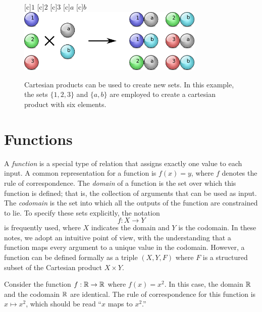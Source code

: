 \begin{figure}[htb]
\begin{center}
\begin{psfrags}
[c]{$1$}
[c]{$2$}
[c]{$3$}
[c]{$a$}
[c]{$b$}
\includegraphics[height=3.06cm]{Figures/1Chapter/cartesianproduct}
\end{psfrags}
\caption{Cartesian products can be used to create new sets.
In this example, the sets $\{ 1, 2, 3 \}$ and $\{ a, b \}$ are employed to create a cartesian product with six elements.}
\end{center}
\end{figure}


\section{Functions}

A \emph{function} is a special type of relation that assigns exactly one value to each input.
A common representation for a function is $f(x) = y$, where $f$ denotes the rule of correspondence.
The \emph{domain} of a function is the set over which this function is defined; that is, the collection of arguments that can be used as input.
The \emph{codomain} is the set into which all the outputs of the function are constrained to lie.
To specify these sets explicitly, the notation
\begin{equation*}
f: X \rightarrow Y
\end{equation*}
is frequently used, where $X$ indicates the domain and $Y$ is the codomain.
In these notes, we adopt an intuitive point of view, with the understanding that a function maps every argument to a unique value in the codomain.
However, a function can be defined formally as a triple $(X, Y, F)$ where $F$ is a structured subset of the Cartesian product $X \times Y$.

\begin{example}
Consider the function $f: \mathbb{R} \rightarrow \mathbb{R}$ where $f(x) = x^2$.
In this case, the domain $\mathbb{R}$ and the codomain $\mathbb{R}$ are identical.
The rule of correspondence for this function is $x \mapsto x^2$, which should be read ``$x$ maps to $x^2$.''
\end{example}

